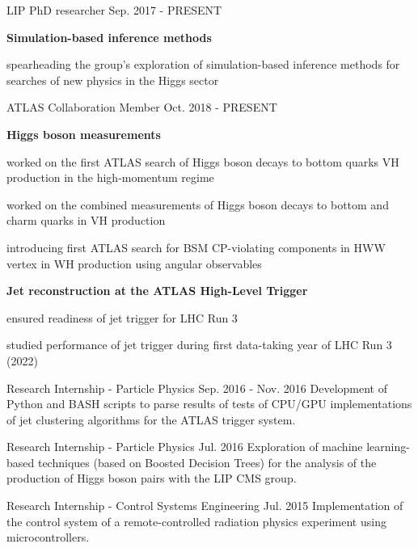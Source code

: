 
\begin{cventries}

    \cventry
    {LIP}
    {PhD researcher}
    {}
    {Sep. 2017 - PRESENT}
    {
        \textbf{Simulation-based inference methods}\vspace{12pt}
        \begin{cvitems}            
            \item {spearheading the group's exploration of simulation-based inference methods for searches of new physics in the Higgs sector}
        \end{cvitems}
    }

    \cventry
    {ATLAS Collaboration}
    {Member}
    {}
    {Oct. 2018 - PRESENT}
    {
        \textbf{Higgs boson measurements}\vspace{14pt}
        \begin{cvitems}
            \item {worked on the first ATLAS search of Higgs boson decays to bottom quarks VH production in the high-momentum regime}
            \item {worked on the combined measurements of Higgs boson decays to bottom and charm quarks in VH production}
            \item {introducing first ATLAS search for BSM CP-violating components in HWW vertex in WH production using angular observables}
        \end{cvitems}\vspace{19pt}
        \textbf{Jet reconstruction at the ATLAS High-Level Trigger}\vspace{14pt}
        \begin{cvitems}
            \item {ensured readiness of jet trigger for LHC Run 3}
            \item {studied performance of jet trigger during first data-taking year of LHC Run 3 (2022)}
        \end{cvitems}
    }

    {Research Internship - Particle Physics}
    {}
    {Sep. 2016 - Nov. 2016}
    {Development of Python and BASH scripts to parse results of tests of CPU/GPU implementations of jet clustering algorithms for the ATLAS trigger system.}

    {Research Internship - Particle Physics}
    {}
    {Jul. 2016}
    {Exploration of machine learning-based techniques (based on Boosted Decision Trees) for the analysis of the production of Higgs boson pairs with the LIP CMS group.}

    {Research Internship - Control Systems Engineering}
    {}
    {Jul. 2015}
    {Implementation of the control system of a remote-controlled radiation physics experiment using microcontrollers.}

\end{cventries}